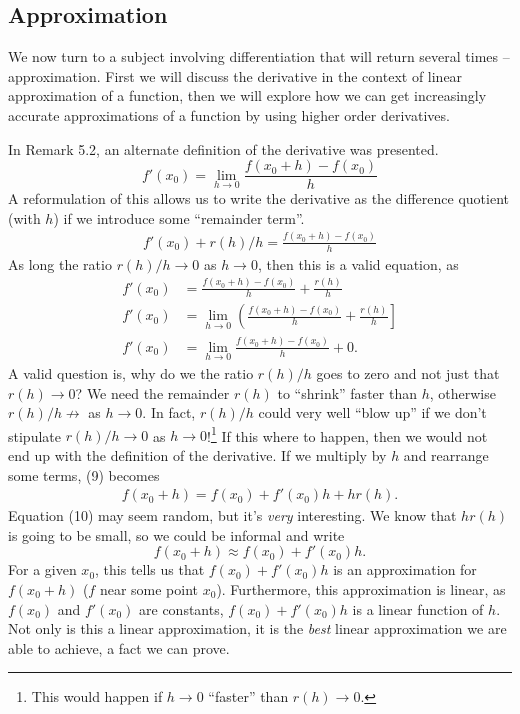 \documentclass{article}
\theoremstyle{definition}
\begin{document}
	\subsection{Approximation}
	We now turn to a subject involving differentiation that will return several times -- approximation. First we will discuss the derivative in the context of linear approximation of a function, then we will explore how we can get increasingly accurate approximations of a function by using higher order derivatives.
	
	In Remark 5.2, an alternate definition of the derivative was presented. $$f'(x_0)=\lim\limits_{h\to 0}\frac{f(x_0+h)-f(x_0)}{h}$$ A reformulation of this allows us to write the derivative as the difference quotient (with $ h $) if we introduce some ``remainder term''. 
	\begin{align}
		f'(x_0)+r(h)/h=\frac{f(x_0+h)-f(x_0)}{h}
	\end{align}
	As long the ratio $ r(h)/h\to 0 $ as $ h\to 0 $, then this is a valid equation, as \begin{align*}
		f'(x_0)&=\frac{f(x_0+h)-f(x_0)}{h}+\frac{r(h)}{h}\\
		f'(x_0)&= \lim\limits_{h\to 0}\left(\frac{f(x_0+h)-f(x_0)}{h} + \frac{r(h)}{h}\right]\\
		f'(x_0)&= \lim\limits_{h\to 0}\frac{f(x_0+h)-f(x_0)}{h}+0.
	\end{align*}
	A valid question is, why do we the ratio $ r(h)/h $ goes to zero and not just that $ r(h)\to 0 $? We need the remainder $ r(h) $ to ``shrink'' faster than $ h $, otherwise $ r(h)/h\not\to $ as $ h\to 0 $. In fact, $ r(h)/h $ could very well ``blow up'' if we don't stipulate $ r(h)/h\to 0 $ as $ h\to 0 $!\footnote{This would happen if $ h\to 0 $ ``faster'' than $ r(h)\to 0 $.} If this where to happen, then we would not end up with the definition of the derivative. If we multiply by $ h $ and rearrange some terms, (9) becomes 
	\begin{align}
		f(x_0+h)=f(x_0)+f'(x_0)h+hr(h).
	\end{align}
	Equation (10) may seem random, but it's \textit{very} interesting. We know that $ hr(h) $ is going to be small, so we could be informal and write $$ f(x_0+h)\approx f(x_0)+f'(x_0)h. $$ For a given $ x_0 $, this tells us that $ f(x_0)+f'(x_0)h $ is an approximation for $ f(x_0+h) $ ($ f $ near some point $ x_0 $). Furthermore, this approximation is linear, as $ f(x_0) $ and $ f'(x_0) $ are constants, $ f(x_0)+f'(x_0)h $ is a linear function of $ h $. Not only is this a linear approximation, it is the \textit{best} linear approximation we are able to achieve, a fact we can prove.
\end{document}

